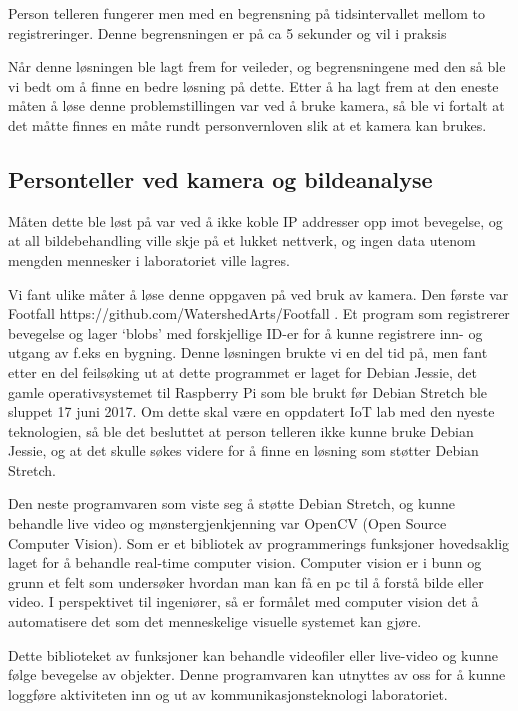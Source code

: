 \documentclass{article}
\begin{document}
Person telleren fungerer men med en begrensning på tidsintervallet mellom to registreringer. Denne begrensningen er på ca 5 sekunder og vil i praksis 

Når denne løsningen ble lagt frem for veileder, og begrensningene med den så ble vi bedt om å finne en bedre løsning på dette. Etter å ha lagt frem at den eneste måten å løse denne problemstillingen var ved å bruke kamera, så ble vi fortalt at det måtte finnes en måte rundt personvernloven slik at et kamera kan brukes.

\subsection{Personteller ved kamera og bildeanalyse}

Måten dette ble løst på var ved å ikke koble IP addresser opp imot bevegelse, og at all bildebehandling ville skje på et lukket nettverk, og ingen data utenom mengden mennesker i laboratoriet ville lagres. 

Vi fant ulike måter å løse denne oppgaven på ved bruk av kamera. Den første var Footfall https://github.com/WatershedArts/Footfall . Et program som registrerer bevegelse og lager ‘blobs’ med forskjellige ID-er for å kunne registrere inn- og utgang av f.eks en bygning. Denne løsningen brukte vi en del tid på, men fant etter en del feilsøking ut at dette programmet er laget for Debian Jessie, det gamle operativsystemet til Raspberry Pi som ble brukt før Debian Stretch ble sluppet 17 juni 2017. Om dette skal være en oppdatert IoT lab med den nyeste teknologien, så ble det besluttet at person telleren ikke kunne bruke Debian Jessie, og at det skulle søkes videre for å finne en løsning som støtter Debian Stretch.

Den neste programvaren som viste seg å støtte Debian Stretch, og kunne behandle live video og mønstergjenkjenning var OpenCV (Open Source Computer Vision). Som er et bibliotek av programmerings funksjoner hovedsaklig laget for å behandle real-time computer vision. Computer vision er i bunn og grunn et felt som undersøker hvordan man kan få en pc til å forstå bilde eller video. I perspektivet til ingeniører, så er formålet med computer vision det å automatisere det som det menneskelige visuelle systemet kan gjøre. 

Dette biblioteket av funksjoner kan behandle videofiler eller live-video og kunne følge bevegelse av objekter. Denne programvaren kan utnyttes av oss for å kunne loggføre aktiviteten inn og ut av kommunikasjonsteknologi laboratoriet. 
\end{document}
